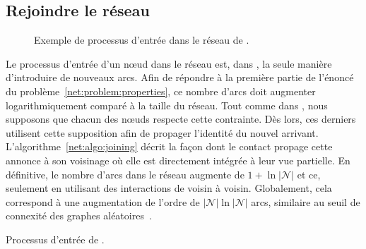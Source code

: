 \subsection{Rejoindre le réseau}
\label{net:subsec:joining}

\begin{figure*}
  \centering
  \hspace{40pt}
  \hspace{10pt}
  \caption[Processus d'entrée dans \SPRAY]
  {\label{net:fig:joiningexample} Exemple de processus d'entrée dans
    le réseau de \SPRAY.}
\end{figure*}

Le processus d'entrée d'un nœud dans le réseau est, dans \SPRAY, la seule
manière d'introduire de nouveaux arcs. Afin de répondre à la première partie de
l'énoncé du problème~\ref{net:problem:properties}, ce nombre d'arcs doit
augmenter logarithmiquement comparé à la taille du réseau. Tout comme dans
\SCAMP, nous supposons que chacun des nœuds respecte cette contrainte. Dès lors,
ces derniers utilisent cette supposition afin de propager l'identité du nouvel
arrivant. L'algorithme~\ref{net:algo:joining} décrit la façon dont le contact
propage cette annonce à son voisinage où elle est directement intégrée à leur
vue partielle. En définitive, le nombre d'arcs dans le réseau augmente de
$1 + \ln |\mathcal{N}|$ et ce, seulement en utilisant des interactions de voisin
à voisin. Globalement, cela correspond à une augmentation de l'ordre de
$|\mathcal{N}| \ln |\mathcal{N}|$ arcs, similaire au seuil de connexité des
graphes aléatoires~\cite{erdos1959random}.

\begin{algorithm}[h]
  
  \caption[Processus d'entrée de \SPRAY] {\label{net:algo:joining}Processus
    d'entrée de \SPRAY.}
\end{algorithm}


